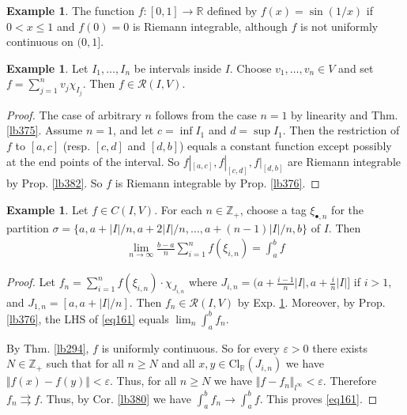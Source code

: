 \documentclass[12pt,b5paper,notitlepage]{article}
\theoremstyle{definition}
\newtheorem{eg}[df]{Example}
\theoremstyle{plain}
\newcommand{\scr}{\mathscr}
\newcommand{\blt}{\bullet}
\newcommand{\Zbb}{\mathbb Z}
\newcommand{\Rbb}{\mathbb R}
\newcommand{\Cl}{\mathrm{Cl}}
\newcommand{\eps}{\varepsilon}
\numberwithin{equation}{section}
\begin{document}
\begin{eg}
The function $f:[0,1]\rightarrow\Rbb$ defined by $f(x)=\sin(1/x)$ if $0<x\leq 1$ and $f(0)=0$ is Riemann integrable, although $f$ is not uniformly continuous on $(0,1]$.
\end{eg}

\begin{eg}\label{lb388}
Let $I_1,\dots,I_n$ be intervals inside $I$. Choose $v_1,\dots,v_n\in V$ and set $f=\sum_{j=1}^n v_j\chi_{I_j}$. Then $f\in\scr R(I,V)$. 
\end{eg}

\begin{proof}
The case of arbitrary $n$ follows from the case $n=1$ by linearity and Thm. \ref{lb375}. Assume $n=1$, and let $c=\inf I_1$ and $d=\sup I_1$. Then the restriction of $f$ to $[a,c]$ (resp. $[c,d]$ and $[d,b]$) equals a constant function except possibly at the end points of the interval. So $f|_{[a,c]},f|_{[c,d]},f|_{[d,b]}$ are Riemann integrable by Prop. \ref{lb382}. So $f$ is Riemann integrable by Prop. \ref{lb376}.
\end{proof}




\begin{eg}\label{lb383}
Let $f\in C(I,V)$. For each $n\in\Zbb_+$, choose a tag $\xi_{\blt,n}$ for the partition $\sigma=\{a,a+|I|/n,a+2|I|/n,\dots,a+(n-1)|I|/n,b\}$ of $I$. Then
\begin{align}
\lim_{n\rightarrow\infty} \frac {b-a}n\sum_{i=1}^n f(\xi_{i,n})=\int_a^bf  \label{eq161}
\end{align}
\end{eg}



\begin{proof}
Let $f_n=\sum_{i=1}^n f(\xi_{i,n})\cdot\chi_{J_{i,n}}$ where $J_{i,n}=\big(a+\frac{i-1}n|I|,a+\frac in|I|\big]$ if $i>1$, and $J_{1,n}=[a,a+|I|/n]$. Then $f_n\in\scr R(I,V)$ by Exp. \ref{lb388}. Moreover, by Prop. \ref{lb376}, the LHS of \eqref{eq161} equals $\lim_n\int_a^b f_n$.

By Thm. \ref{lb294}, $f$ is uniformly continuous. So for every $\eps>0$ there exists $N\in\Zbb_+$ such that for all $n\geq N$ and all $x,y\in \Cl_\Rbb(J_{i,n})$ we have $\Vert f(x)-f(y)\Vert<\eps$. Thus, for all $n\geq N$ we have $\Vert f-f_n\Vert_{l^\infty}<\eps$. Therefore $f_n\rightrightarrows f$. Thus, by Cor. \ref{lb380} we have $\int_a^b f_n\rightarrow\int_a^b f$. This proves \eqref{eq161}.
\end{proof}
\end{document}
